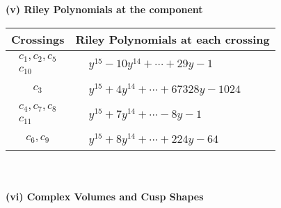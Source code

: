 \documentclass[1p]{elsarticle_modified}
\theoremstyle{definition}
\begin{document}
\newpage\renewcommand{\arraystretch}{1}
\flushleft \textbf{(v) Riley Polynomials at the component}\newline \\
\begin{tabular}{m{50pt}|m{274pt}}
Crossings & \hspace{64pt}Riley Polynomials at each crossing \\
\hline $$\begin{aligned}c_{1},c_{2},c_{5}\\c_{10}\end{aligned}$$&$\begin{aligned}
&y^{15}-10 y^{14}+\cdots+29 y-1
\end{aligned}$\\
\hline $$\begin{aligned}c_{3}\end{aligned}$$&$\begin{aligned}
&y^{15}+4 y^{14}+\cdots+67328 y-1024
\end{aligned}$\\
\hline $$\begin{aligned}c_{4},c_{7},c_{8}\\c_{11}\end{aligned}$$&$\begin{aligned}
&y^{15}+7 y^{14}+\cdots-8 y-1
\end{aligned}$\\
\hline $$\begin{aligned}c_{6},c_{9}\end{aligned}$$&$\begin{aligned}
&y^{15}+8 y^{14}+\cdots+224 y-64
\end{aligned}$\\
\hline
\end{tabular}\\~\\
\newpage\flushleft \textbf{(vi) Complex Volumes and Cusp Shapes}
\end{document}
